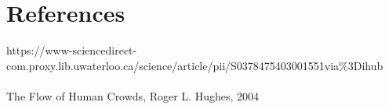 \documentclass{article}
\begin{document}
\section{References}
https://www-sciencedirect-com.proxy.lib.uwaterloo.ca/science/article/pii/S0378475403001551via\%3Dihub \\
\\
The Flow of Human Crowds, Roger L. Hughes, 2004
\end{document}
